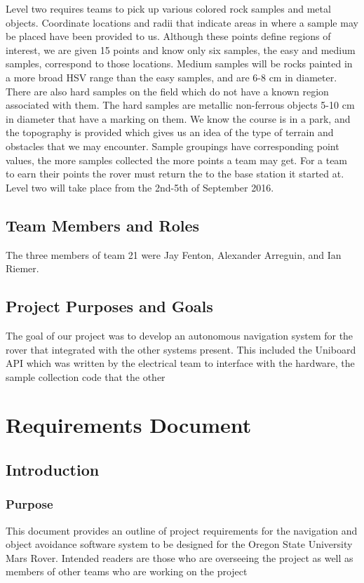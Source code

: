 \documentclass[10pt, oneside,onecolumn]{IEEEtran}
\begin{document}
Level two requires teams to pick up various colored rock samples and metal objects. Coordinate locations and radii that indicate areas in where a sample may be placed have been provided to us. Although these points define regions of interest, we are given 15 points and know only six samples, the easy and medium samples, correspond to those locations. Medium samples will be rocks painted in a more broad HSV range than the easy samples, and are 6-8 cm in diameter. There are also hard samples on the field which do not have a known region associated with them. The hard samples are metallic non-ferrous objects 5-10 cm in diameter that have a marking on them. We know the course is in a park, and the topography is provided which gives us an idea of the type of terrain and obstacles that we may encounter. Sample groupings have corresponding point values, the more samples collected the more points a team may get. For a team to earn their points the rover must return the to the base station it started at. Level two will take place from the 2nd-5th of September 2016.

\subsection{Team Members and Roles}
The three members of team 21 were Jay Fenton, Alexander Arreguin, and Ian Riemer. 

\subsection{Project Purposes and Goals}

The goal of our project was to develop an autonomous navigation system for the rover that integrated with the other systems present. This included the Uniboard API which was written by the electrical team to interface with the hardware, the sample collection code that the other


\section{Requirements Document}

\subsection{Introduction}

\subsubsection{Purpose}
This document provides an outline of project requirements for the navigation and object avoidance software system to be designed for the Oregon State University Mars Rover. Intended readers are those who are overseeing the project as well as members of other teams who are working on the project 
\end{document}
